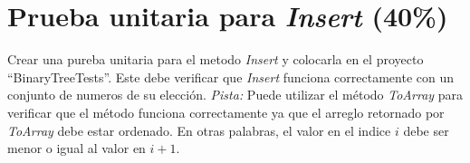 \documentclass{article}
\begin{document}
\section*{Prueba unitaria para \emph{Insert} (40\%)}
Crear una pureba unitaria para el metodo \emph{Insert} y colocarla en el proyecto
``BinaryTreeTests''. Este debe verificar que \emph{Insert} funciona correctamente
con un conjunto de numeros de su elecci\'on. \emph{Pista:} Puede utilizar el m\'etodo
\emph{ToArray} para verificar que el m\'etodo funciona correctamente ya que el
arreglo retornado por \emph{ToArray} debe estar ordenado. En otras palabras, el valor
en el indice $i$ debe ser menor o igual al valor en $i+1$.
\end{document}
